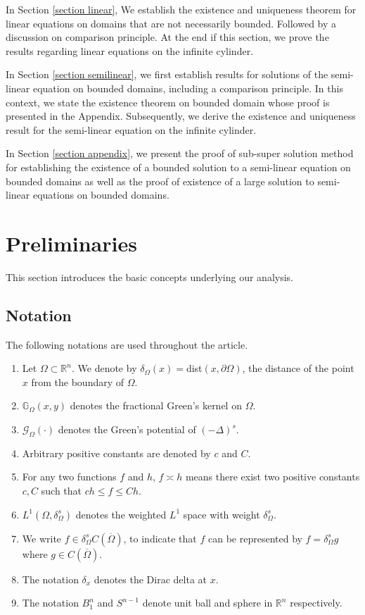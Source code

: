 \documentclass{amsart}
\newcommand{\slap}{(-\Delta)^{s}}
\newcommand{\rn}{\mathbb{R}^{n}}
\newcommand{\g}[1]{\mathcal{G}_{#1}}
\newcommand{\gk}[1]{\mathbb{G}_{#1}}
\begin{document}
In Section \ref{section linear}, We establish the existence and uniqueness theorem for linear equations on domains that are not necessarily bounded. Followed by a discussion on comparison principle. At the end if this section, we prove the results regarding linear equations on the infinite cylinder.

In Section  \ref{section semilinear}, we first establish results for solutions of the semi-linear equation on bounded domains, including a comparison principle. In this context, we state the existence theorem on bounded domain whose proof is presented in the Appendix. Subsequently, we derive the existence and uniqueness result for the semi-linear equation on the infinite cylinder.

In Section \ref{section appendix}, we present the proof of sub-super solution method for establishing the existence of a bounded solution to a semi-linear equation on bounded domains as well as the proof of existence of a large solution to semi-linear equations on bounded domains.

 
\section{Preliminaries}\label{section prilims}
This section introduces the basic concepts underlying our analysis. 


\subsection{Notation}
 The following notations are used throughout the article.
\begin{enumerate}
    \item Let $\Omega\subset \rn$. We denote by $\delta_{\Omega}(x)=$dist$(x,\partial\Omega)$, the distance of the point $x$ from the boundary of $\Omega$.
    \item $\gk{\Omega}(x,y)$ denotes the fractional Green's kernel on $\Omega$.
    \item $\g{\Omega}(\cdot)$ denotes the Green's potential of $\slap$.
    \item Arbitrary positive constants are denoted by $c$ and $C$.
    \item For any two functions $f$ and $h$, $f\asymp h$  means there exist two positive constants $c,C$ such that $ch\leq f\leq Ch$.
\item $L^{1}(\Omega,\delta^{s}_{\Omega
})$ denotes the weighted $L^{1}$ space with weight $\delta_{\Omega
}^{s}$.
\item We write $f\in \delta_{\Omega}^{s}C(\overline{\Omega})$, to indicate that $f$ can be represented by $f=\delta_{\Omega}^{s}g$ where $g\in C(\overline{\Omega})$.
\item The notation $\delta_{x}$ denotes the Dirac delta at $x$.
\item The notation $B_{1}^{n}$ and $S^{n-1}$ denote unit ball and sphere in $\rn$ respectively.

\end{enumerate}
\end{document}
